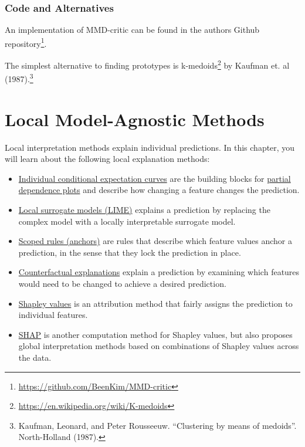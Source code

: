 \documentclass[12pt,]{krantz}
\providecommand{\tightlist}{%
  \setlength{\itemsep}{0pt}\setlength{\parskip}{0pt}}
\renewcommand{\href}[2]{#2\footnote{\url{#1}}}
\begin{document}
\subsection{Code and Alternatives}\label{code-and-alternatives}

An implementation of MMD-critic can be found in
\href{https://github.com/BeenKim/MMD-critic}{the authors Github
repository}.

The simplest alternative to finding prototypes is
\href{https://en.wikipedia.org/wiki/K-medoids}{k-medoids} by Kaufman et.
al (1987).\footnote{Kaufman, Leonard, and Peter Rousseeuw. ``Clustering
  by means of medoids''. North-Holland (1987).}

\hypertarget{local-methods}{\chapter{Local Model-Agnostic
Methods}\label{local-methods}}

Local interpretation methods explain individual predictions. In this
chapter, you will learn about the following local explanation methods:

\begin{itemize}
\tightlist
\item
  \protect\hyperlink{ice}{Individual conditional expectation curves} are
  the building blocks for \protect\hyperlink{pdp}{partial dependence
  plots} and describe how changing a feature changes the prediction.
\item
  \protect\hyperlink{lime}{Local surrogate models (LIME)} explains a
  prediction by replacing the complex model with a locally interpretable
  surrogate model.
\item
  \protect\hyperlink{anchors}{Scoped rules (anchors)} are rules that
  describe which feature values anchor a prediction, in the sense that
  they lock the prediction in place.
\item
  \protect\hyperlink{counterfactual}{Counterfactual explanations}
  explain a prediction by examining which features would need to be
  changed to achieve a desired prediction.
\item
  \protect\hyperlink{shapley}{Shapley values} is an attribution method
  that fairly assigns the prediction to individual features.
\item
  \protect\hyperlink{shap}{SHAP} is another computation method for
  Shapley values, but also proposes global interpretation methods based
  on combinations of Shapley values across the data.
\end{itemize}
\end{document}
